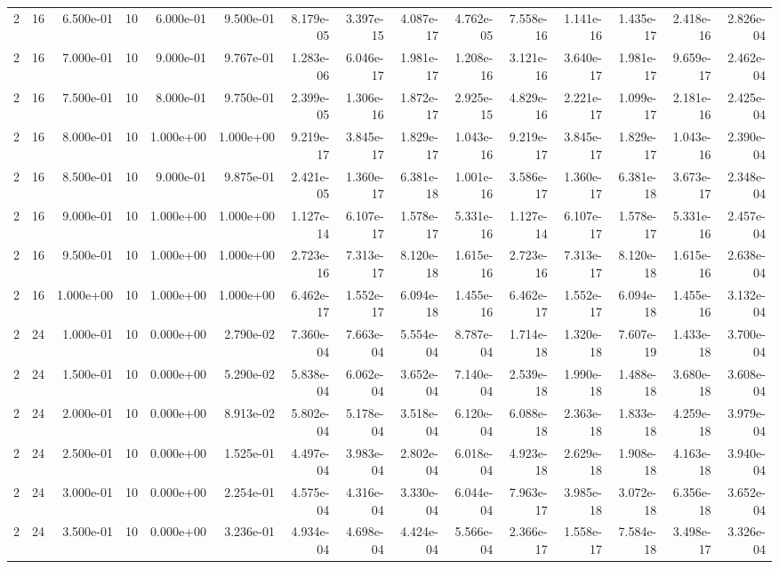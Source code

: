 \begin{tabular}{rrrrrrrrrrrrrrr}
2 & 16 & 6.500e-01 & 10 & 6.000e-01 & 9.500e-01 & 8.179e-05 & 3.397e-15 & 4.087e-17 & 4.762e-05 & 7.558e-16 & 1.141e-16 & 1.435e-17 & 2.418e-16 & 2.826e-04 \\
2 & 16 & 7.000e-01 & 10 & 9.000e-01 & 9.767e-01 & 1.283e-06 & 6.046e-17 & 1.981e-17 & 1.208e-16 & 3.121e-16 & 3.640e-17 & 1.981e-17 & 9.659e-17 & 2.462e-04 \\
2 & 16 & 7.500e-01 & 10 & 8.000e-01 & 9.750e-01 & 2.399e-05 & 1.306e-16 & 1.872e-17 & 2.925e-15 & 4.829e-16 & 2.221e-17 & 1.099e-17 & 2.181e-16 & 2.425e-04 \\
2 & 16 & 8.000e-01 & 10 & 1.000e+00 & 1.000e+00 & 9.219e-17 & 3.845e-17 & 1.829e-17 & 1.043e-16 & 9.219e-17 & 3.845e-17 & 1.829e-17 & 1.043e-16 & 2.390e-04 \\
2 & 16 & 8.500e-01 & 10 & 9.000e-01 & 9.875e-01 & 2.421e-05 & 1.360e-17 & 6.381e-18 & 1.001e-16 & 3.586e-17 & 1.360e-17 & 6.381e-18 & 3.673e-17 & 2.348e-04 \\
2 & 16 & 9.000e-01 & 10 & 1.000e+00 & 1.000e+00 & 1.127e-14 & 6.107e-17 & 1.578e-17 & 5.331e-16 & 1.127e-14 & 6.107e-17 & 1.578e-17 & 5.331e-16 & 2.457e-04 \\
2 & 16 & 9.500e-01 & 10 & 1.000e+00 & 1.000e+00 & 2.723e-16 & 7.313e-17 & 8.120e-18 & 1.615e-16 & 2.723e-16 & 7.313e-17 & 8.120e-18 & 1.615e-16 & 2.638e-04 \\
2 & 16 & 1.000e+00 & 10 & 1.000e+00 & 1.000e+00 & 6.462e-17 & 1.552e-17 & 6.094e-18 & 1.455e-16 & 6.462e-17 & 1.552e-17 & 6.094e-18 & 1.455e-16 & 3.132e-04 \\
2 & 24 & 1.000e-01 & 10 & 0.000e+00 & 2.790e-02 & 7.360e-04 & 7.663e-04 & 5.554e-04 & 8.787e-04 & 1.714e-18 & 1.320e-18 & 7.607e-19 & 1.433e-18 & 3.700e-04 \\
2 & 24 & 1.500e-01 & 10 & 0.000e+00 & 5.290e-02 & 5.838e-04 & 6.062e-04 & 3.652e-04 & 7.140e-04 & 2.539e-18 & 1.990e-18 & 1.488e-18 & 3.680e-18 & 3.608e-04 \\
2 & 24 & 2.000e-01 & 10 & 0.000e+00 & 8.913e-02 & 5.802e-04 & 5.178e-04 & 3.518e-04 & 6.120e-04 & 6.088e-18 & 2.363e-18 & 1.833e-18 & 4.259e-18 & 3.979e-04 \\
2 & 24 & 2.500e-01 & 10 & 0.000e+00 & 1.525e-01 & 4.497e-04 & 3.983e-04 & 2.802e-04 & 6.018e-04 & 4.923e-18 & 2.629e-18 & 1.908e-18 & 4.163e-18 & 3.940e-04 \\
2 & 24 & 3.000e-01 & 10 & 0.000e+00 & 2.254e-01 & 4.575e-04 & 4.316e-04 & 3.330e-04 & 6.044e-04 & 7.963e-17 & 3.985e-18 & 3.072e-18 & 6.356e-18 & 3.652e-04 \\
2 & 24 & 3.500e-01 & 10 & 0.000e+00 & 3.236e-01 & 4.934e-04 & 4.698e-04 & 4.424e-04 & 5.566e-04 & 2.366e-17 & 1.558e-17 & 7.584e-18 & 3.498e-17 & 3.326e-04 \\

\end{tabular}
